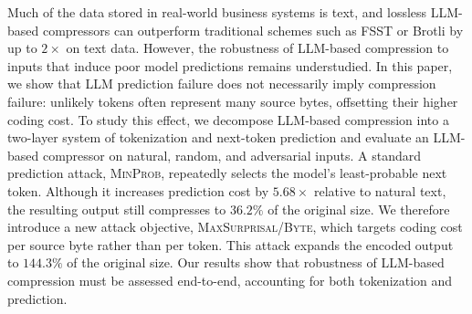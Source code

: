 Much of the data stored in real-world business systems is text, and lossless LLM-based compressors can outperform traditional schemes such as FSST or Brotli by up to $2\times$ on text data. However, the robustness of LLM-based compression to inputs that induce poor model predictions remains understudied. In this paper, we show that LLM prediction failure does not necessarily imply compression failure: unlikely tokens often represent many source bytes, offsetting their higher coding cost. To study this effect, we decompose LLM-based compression into a two-layer system of tokenization and next-token prediction and evaluate an LLM-based compressor on natural, random, and adversarial inputs. A standard prediction attack, \textsc{MinProb}, repeatedly selects the model’s least-probable next token. Although it increases prediction cost by \(5.68\times\) relative to natural text, the resulting output still compresses to \(36.2\%\) of the original size. We therefore introduce a new attack objective, \textsc{MaxSurprisal/Byte}, which targets coding cost per source byte rather than per token. This attack expands the encoded output to \(144.3\%\) of the original size. Our results show that robustness of LLM-based compression must be assessed end-to-end, accounting for both tokenization and prediction.

